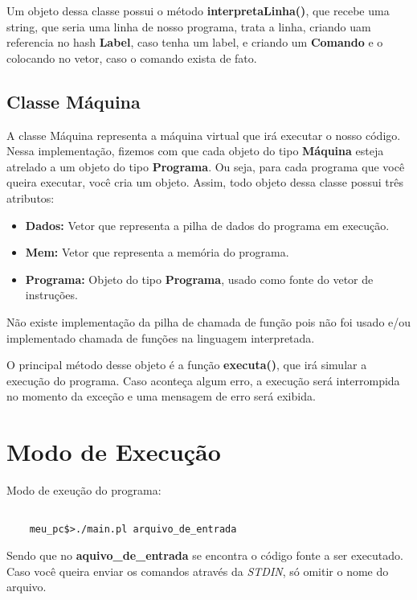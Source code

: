 \documentclass[11pt]{article}
\begin{document}
Um objeto dessa classe possui o método \textbf{{\color{red}interpretaLinha}()}, que recebe uma string, que seria uma linha de nosso programa, trata a linha, criando uam referencia no hash \textbf{Label}, caso tenha um label, e criando um \textbf{Comando} e o colocando no vetor, caso o comando exista de fato.


\subsection{Classe Máquina}

A classe Máquina representa a máquina virtual que irá executar o nosso código. Nessa implementação, fizemos com que cada objeto do tipo \textbf{\color{red}Máquina} esteja atrelado a um objeto do tipo \textbf{\color{red}Programa}. Ou seja, para cada programa que você queira executar, você cria um objeto. Assim, todo objeto dessa classe possui três atributos:

\begin{itemize}

\item \textbf{Dados:} Vetor que representa a pilha de dados do programa em execução.

\item \textbf{Mem:} Vetor que representa a memória do programa.

\item \textbf{Programa:} Objeto do tipo \textbf{\color{red}Programa}, usado como fonte do vetor de instruções.



\end{itemize}

Não existe implementação da pilha de chamada de função pois não foi usado e/ou implementado chamada de funções na linguagem interpretada.

O principal método desse objeto é a função \textbf{\color{red}executa()}, que irá simular a execução do programa. Caso aconteça algum erro, a execução será interrompida no momento da exceção e uma mensagem de erro será exibida.


\section{Modo de Execução}

Modo de exeução do programa:

\begin{verbatim}

	meu_pc$>./main.pl arquivo_de_entrada

\end{verbatim}

Sendo que no \textbf{aquivo\_de\_entrada} se encontra o código fonte a ser executado. Caso você queira enviar os comandos através da 
\emph{STDIN}, só omitir o nome do arquivo.
\end{document}
